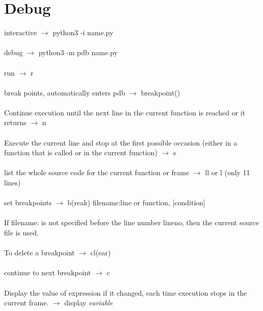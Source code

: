 \documentclass{article}
\begin{document}
\section{Debug}


 interactive $\rightarrow$ python3 -i name.py\\\\
 debug $\rightarrow$ python3 -m pdb name.py \cite{pdb}\\\\
 run $\rightarrow$ r\\\\
 break points, automatically enters pdb $\rightarrow$  breakpoint()\\\\
 Continue execution until the next line in the current function is reached or it returns $\rightarrow$ n\\\\
Execute the current line and stop at the first possible occasion (either in a function that is called or in the current function)  $\rightarrow$ s\\\\
 list the whole source code for the current function or frame $\rightarrow$ ll  or l (only 11 lines)\\\\
 set breakpoints $\rightarrow$ b(reak) filename:line or function, [condition]\\\\
If filename: is not specified before the line number lineno, then the current source file is used.\\\\
 To delete a breakpoint $\rightarrow$ cl(ear)\\\\
 continue to next breakpoint $\rightarrow$ c\\\\
 Display the value of expression if it changed, each time execution stops in the current frame. $\rightarrow$  display \textit{variable}\\\\
\end{document}
